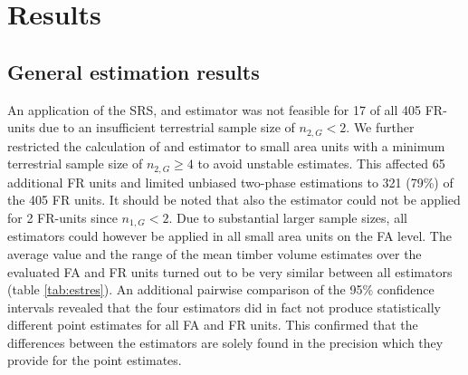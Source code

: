 \section{Results}
\label{sec:Res}

\subsection{General estimation results}
\label{sec:feasest}

An application of the SRS, \psmall{} and \extpsynth{} estimator was not feasible for 17 of all 405 FR-units due to an insufficient terrestrial sample size of $n_{2,G} < 2$. We further restricted the calculation of \psmall{} and \extpsynth{} estimator to small area units with a minimum terrestrial sample size of $n_{2,G} \geq 4$ to avoid unstable estimates. This affected 65 additional FR units and limited unbiased two-phase estimations to 321 (79\%) of the 405 FR units. It should be noted that also the \psynth{} estimator could not be applied for 2 FR-units since $n_{1,G} < 2$. Due to substantial larger sample sizes, all estimators could however be applied in all small area units on the FA level. The average value and the range of the mean timber volume estimates over the evaluated FA and FR units turned out to be very similar between all estimators (table \ref{tab:estres}). An additional pairwise comparison of the 95\% confidence intervals revealed that the four estimators did in fact not produce statistically different point estimates for all FA and FR units. This confirmed that the differences between the estimators are solely found in the precision which they provide for the point estimates.


%
% 

